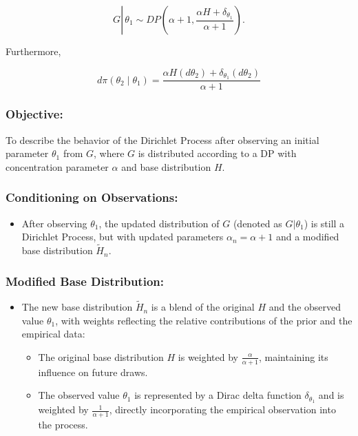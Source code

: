 \documentclass[10pt]{article}
\begin{document}
$$
G \left\lvert\, \theta_1 \sim D P\left(\alpha+1, \frac{\alpha H+\delta_{\theta_1}}{\alpha+1}\right) .\right.
$$

Furthermore,

$$
d \pi\left(\theta_2 \mid \theta_1\right)=\frac{\alpha H\left(d \theta_2\right)+\delta_{\theta_1}\left(d \theta_2\right)}{\alpha+1}
$$

\subsubsection*{Objective:}
To describe the behavior of the Dirichlet Process after observing an initial parameter \( \theta_1 \) from \( G \), where \( G \) is distributed according to a DP with concentration parameter \( \alpha \) and base distribution \( H \).

\subsubsection*{Conditioning on Observations:}
\begin{itemize}
  \item After observing \( \theta_1 \), the updated distribution of \( G \) (denoted as \( G|\theta_1 \)) is still a Dirichlet Process, but with updated parameters \( \alpha_n = \alpha + 1 \) and a modified base distribution \( \tilde{H}_n \).
\end{itemize}

\subsubsection*{Modified Base Distribution:}
\begin{itemize}
  \item The new base distribution \( \tilde{H}_n \) is a blend of the original \( H \) and the observed value \( \theta_1 \), with weights reflecting the relative contributions of the prior and the empirical data:
  \begin{itemize}
    \item The original base distribution \( H \) is weighted by \( \frac{\alpha}{\alpha + 1} \), maintaining its influence on future draws.
    \item The observed value \( \theta_1 \) is represented by a Dirac delta function \( \delta_{\theta_1} \) and is weighted by \( \frac{1}{\alpha + 1} \), directly incorporating the empirical observation into the process.
  \end{itemize}
\end{itemize}
\end{document}
